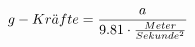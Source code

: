 \documentclass[preview]{standalone}
\begin{document}
\begin{align*}
\special{dvisvgm:raw <g id='unique000'>}g-Kr\ddot{a}fte = \frac{a}{9.81 \cdot \frac{Meter}{Sekunde^{2}}}\special{dvisvgm:raw </g>}
\end{align*}
\end{document}
